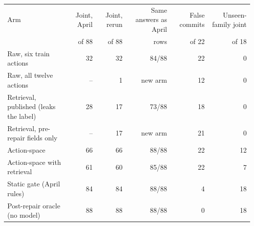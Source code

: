 \begin{tabular}{lrrrrr}
\toprule
Arm & Joint, April & Joint, rerun & Same answers as April & False commits & Unseen-family joint \\
& of 88 & of 88 & rows & of 22 & of 18 \\
\midrule
Raw, six train actions & 32 & 32 & 84/88 & 22 & 0 \\
Raw, all twelve actions & -- & 1 & new arm & 12 & 0 \\
Retrieval, published (leaks the label) & 28 & 17 & 73/88 & 18 & 0 \\
Retrieval, pre-repair fields only & -- & 17 & new arm & 21 & 0 \\
Action-space & 66 & 66 & 88/88 & 22 & 12 \\
Action-space with retrieval & 61 & 60 & 85/88 & 22 & 7 \\
Static gate (April rules) & 84 & 84 & 88/88 & 4 & 18 \\
Post-repair oracle (no model) & 88 & 88 & 88/88 & 0 & 18 \\
\bottomrule
\end{tabular}
